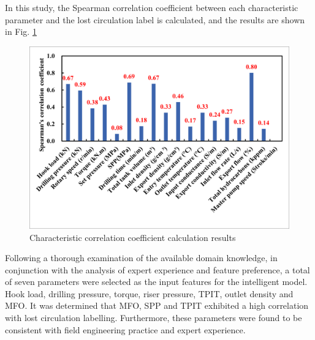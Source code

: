 \documentclass[journal,article,submit,pdftex,moreauthors]{Definitions/mdpi}
\begin{document}
In this study, the Spearman correlation coefficient between each characteristic parameter and the lost circulation label is calculated, and the results are shown in Fig.  \ref{fig:Characteristic correlation coefficient calculation results}

\begin{figure}[H]
    \centering
    \includegraphics[width=0.75\linewidth]{图片/spearman.png}
    \caption{Characteristic correlation coefficient calculation results}
    \label{fig:Characteristic correlation coefficient calculation results}
\end{figure}

Following a thorough examination of the available domain knowledge, in conjunction with the analysis of expert experience and feature preference, a total of seven parameters were selected as the input features for the intelligent model. Hook load, drilling pressure, torque, riser pressure, TPIT, outlet density and MFO. It was determined that MFO, SPP and TPIT exhibited a high correlation with lost circulation labelling. Furthermore, these parameters were found to be consistent with field engineering practice and expert experience.

\end{document}
